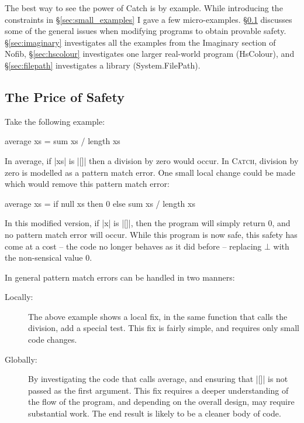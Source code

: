 \documentclass[preprint]{sigplanconf}
\newcommand{\C}[1]{\textsf{#1}}
\newcommand{\catch}{\textsc{Catch}}
\begin{document}
The best way to see the power of Catch is by example. While introducing the constraints in \S\ref{sec:small_examples} I gave a few micro-examples. \S\ref{sec:safety} discusses some of the general issues when modifying programs to obtain provable safety. \S\ref{sec:imaginary} investigates all the examples from the Imaginary section of Nofib, \S\ref{sec:hscolour} investigates one larger real-world program (HsColour), and \S\ref{sec:filepath} investigates a library (System.FilePath).

\subsection{The Price of Safety}
\label{sec:safety}

Take the following example:

\begin{code}
average xs = sum xs / length xs
\end{code}

In \C{average}, if |xs| is |[]| then a division by zero would occur. In \catch{}, division by zero is modelled as a pattern match error. One small local change could be made which would remove this pattern match error:

\begin{code}
average xs = if null xs then 0 else sum xs / length xs
\end{code}

In this modified version, if |x| is |[]|, then the program will simply return 0, and no pattern match error will occur. While this program is now safe, this safety has come at a cost -- the code no longer behaves as it did before -- replacing $\bot{}$ with the non-sensical value 0.

In general pattern match errors can be handled in two manners:

\begin{description}
\item [Locally:] The above example shows a local fix, in the same function that calls the division, add a special test. This fix is fairly simple, and requires only small code changes.

\item [Globally:] By investigating the code that calls \C{average}, and ensuring that |[]| is not passed as the first argument. This fix requires a deeper understanding of the flow of the program, and depending on the overall design, may require substantial work. The end result is likely to be a cleaner body of code.
\end{description}
\end{document}
